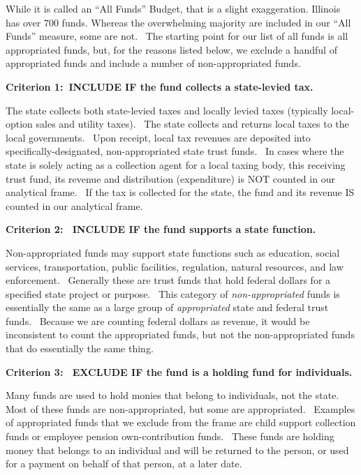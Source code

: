 \documentclass[
  letterpaper,
  DIV=11,
  numbers=noendperiod]{scrreport}
\begin{document}

While it is called an ``All Funds'' Budget, that is a slight
exaggeration. Illinois has over 700 funds. Whereas the overwhelming
majority are included in our ``All Funds'' measure, some are not.~ The
starting point for our list of all funds is all appropriated funds, but,
for the reasons listed below, we exclude a handful of appropriated funds
and include a number of non-appropriated funds.~

\textbf{Criterion 1:~INCLUDE IF the fund collects a state-levied tax.}

The state collects both state-levied taxes and locally levied taxes
(typically local-option sales and utility taxes).~ The state collects
and returns local taxes to the local governments.~ Upon receipt, local
tax revenues are deposited into specifically-designated,
non-appropriated state trust funds.~ In cases where the state is solely
acting as a collection agent for a local taxing body, this receiving
trust fund, its revenue and distribution (expenditure) is NOT counted in
our analytical frame.~ If the tax is collected for the state, the fund
and its revenue IS counted in our analytical frame.~

\textbf{Criterion 2:~ INCLUDE IF the fund supports a state function.}

Non-appropriated funds may support state functions such as education,
social services, transportation, public facilities, regulation, natural
resources, and law enforcement.~ Generally these are trust funds that
hold federal dollars for a specified state project or purpose.~ This
category of \emph{non-appropriated} funds is essentially the same as a
large group of \emph{appropriated} state and federal trust funds.~
Because we are counting federal dollars as revenue, it would be
inconsistent to count the appropriated funds, but not the
non-appropriated funds that do essentially the same thing.~

\textbf{Criterion 3:~ EXCLUDE IF the fund is a holding fund for
individuals.}

Many funds are used to hold monies that belong to individuals, not the
state.~ Most of these funds are non-appropriated, but some are
appropriated.~ Examples of appropriated funds that we exclude from the
frame are child support collection funds or employee pension
own-contribution funds.~ These funds are holding money that belongs to
an individual and will be returned to the person, or used for a payment
on behalf of that person, at a later date.~
\end{document}
